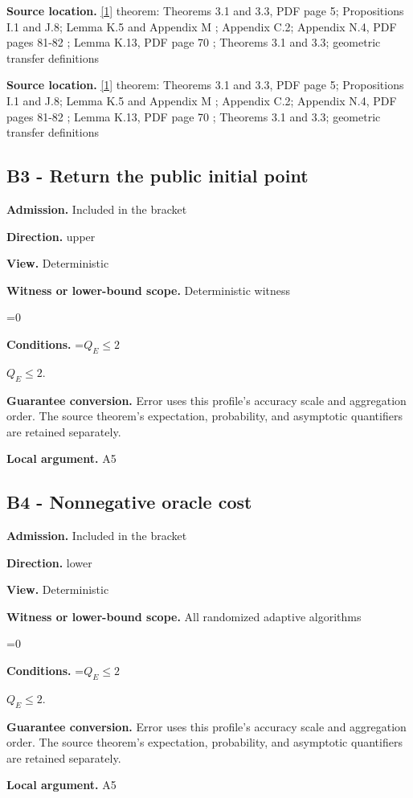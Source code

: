 \documentclass[10pt,a4paper]{article}
\newcommand{\AtlasMath}[1]{\par\begingroup\centering\setbox0=\hbox{$\displaystyle #1$}\ifdim\wd0>1.4\linewidth\typeout{ATLAS WIDE FORMULA: \the\wd0}\fi\ifdim\wd0>\linewidth\resizebox{\linewidth}{!}{\box0}\else\box0\fi\par\endgroup}
\newcommand{\AtlasInlineMath}[1]{\begingroup\setbox0=\hbox{$#1$}\ifdim\wd0>.4\linewidth\endgroup\AtlasMath{#1}\else\endgroup$#1$\fi}
\begin{document}
\textbf{Source location.} \href{https://arxiv.org/html/2610.00345v1}{[1]} theorem: Theorems 3.1 and 3.3, PDF page 5; Propositions I.1 and J.8; Lemma K.5 and Appendix M ; Appendix C.2; Appendix N.4, PDF pages 81-82 ; Lemma K.13, PDF page 70 ; Theorems 3.1 and 3.3; geometric transfer definitions

\textbf{Source location.} \href{https://arxiv.org/html/2610.00345v1}{[1]} theorem: Theorems 3.1 and 3.3, PDF page 5; Propositions I.1 and J.8; Lemma K.5 and Appendix M ; Appendix C.2; Appendix N.4, PDF pages 81-82 ; Lemma K.13, PDF page 70 ; Theorems 3.1 and 3.3; geometric transfer definitions

\subsection{B3 - Return the public initial point}
\textbf{Admission.} Included in the bracket

\textbf{Direction.} upper

\textbf{View.} Deterministic

\textbf{Witness or lower-bound scope.} Deterministic witness

\AtlasMath{0}
\textbf{Conditions.} \AtlasInlineMath{Q_E\le 2}.

\textbf{Guarantee conversion.} Error uses this profile's accuracy scale and aggregation order. The source theorem's expectation, probability, and asymptotic quantifiers are retained separately.

\textbf{Local argument.} A5

\subsection{B4 - Nonnegative oracle cost}
\textbf{Admission.} Included in the bracket

\textbf{Direction.} lower

\textbf{View.} Deterministic

\textbf{Witness or lower-bound scope.} All randomized adaptive algorithms

\AtlasMath{0}
\textbf{Conditions.} \AtlasInlineMath{Q_E\le 2}.

\textbf{Guarantee conversion.} Error uses this profile's accuracy scale and aggregation order. The source theorem's expectation, probability, and asymptotic quantifiers are retained separately.

\textbf{Local argument.} A5
\end{document}
